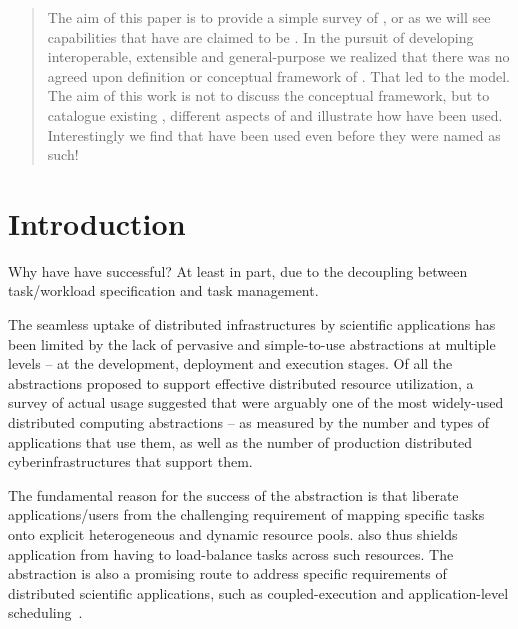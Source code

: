 \documentclass{sig-alternate}
\begin{document}
\date{}
\maketitle

\begin{abstract} 
 The aim of this paper is to provide a simple survey of \pilotjobs, or
 as we will see capabilities that have are claimed to be \pilotjobs.
 In the pursuit of developing interoperable, extensible and
 general-purpose \pilotjobs we realized that there was no agreed upon
 definition or conceptual framework of \pilotjobs. That led to the
 \pstar model. The aim of this work is not to discuss the \pstar
 conceptual framework, but to catalogue existing \pilotjobs, different
 aspects of \pilotjobs and illustrate how \pilotjobs have been used.
 Interestingly we find that \pilotjobs have been used even before they
 were named as such!

\end{abstract}

\section{Introduction} 

Why have \pilotjobs have successful? At least in part, due to the
decoupling between task/workload specification and task management.

The seamless uptake of distributed infrastructures by scientific
applications has been limited by the lack of pervasive and
simple-to-use abstractions at multiple levels – at the development,
deployment and execution stages. Of all the abstractions proposed to
support effective distributed resource utilization, a survey of actual
usage suggested that \pilotjobs were arguably one of the most
widely-used distributed computing abstractions – as measured by the
number and types of applications that use them, as well as the number
of production distributed cyberinfrastructures that support them.  

 The fundamental
reason for the success of the \pilotjob abstraction is that \pilotjob
liberate applications/users from the challenging requirement of
mapping specific tasks onto explicit heterogeneous and dynamic
resource pools. \pilotjobs also thus shields application from having
to load-balance tasks across such resources.  The \pilotjob
abstraction is also a promising route to address specific requirements
of distributed scientific applications, such as coupled-execution and
application-level
scheduling~\cite{ko-efficient,DBLP:conf/hpdc/KimHMAJ10}.
\end{document}
